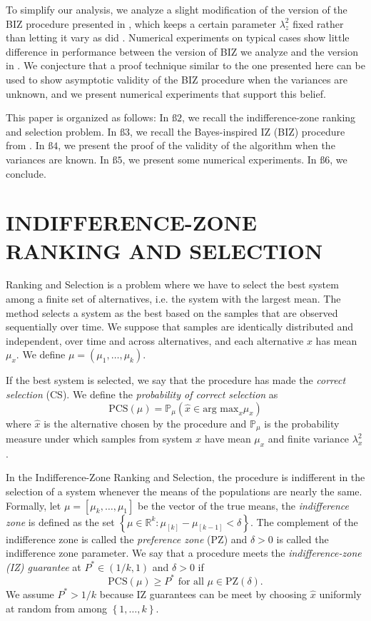\documentclass{wscpaperproc}
\theoremstyle{wsc}
\begin{document}
To simplify our analysis, we analyze a slight modification of the version of the BIZ procedure presented in \cite{Frazier:BIZ}, which keeps a certain parameter $\lambda^2_z$ fixed rather than letting it vary as did \cite{Frazier:BIZ}.  Numerical experiments on typical cases show little difference in performance between the version of BIZ we analyze and the version in .
We conjecture that a proof technique similar to the one presented here can be used to show asymptotic validity of the BIZ procedure when
the variances are unknown, and we present numerical experiments that support this belief. 


This paper is organized as follows: In $\text{ß}2$, we recall the
indifference-zone ranking and selection problem. In $\text{ß}3$,
we recall the Bayes-inspired IZ (BIZ) procedure from . In $\text{ß}4$,
we present the proof of the validity of the algorithm when the variances
are known. In $\text{ß}5$, we present some numerical experiments. 
In $\text{ß}6$, we conclude.



\section{INDIFFERENCE-ZONE RANKING AND SELECTION}

Ranking and Selection is a problem where we have to select the best system
among a finite set of alternatives, i.e. the system with the largest
mean. The method selects a system as the best based on the samples
that are observed sequentially over time. We suppose that samples
are identically distributed and independent, over time and across alternatives, and
each alternative $x$ has mean $\mu_{x}$. We define $\mu=(\mu_{1},\ldots,\mu_{k})$.

If the best system is selected, we say that the procedure has made the \emph{correct selection}
(CS). We define the \emph{probability of correct selection} as 
\[
\mbox{PCS}\left(\mu\right)=\mathbb{P}_{\mu}\left(\hat{x}\in\mbox{arg max}_{x}\mu_{x}\right)
\]
where $\hat{x}$ is the alternative chosen by the procedure and $\mathbb{P}_{\mu}$
is the probability measure under which samples from system $x$ have
mean $\mu_{x}$ and finite variance $\lambda_{x}^{2}$.

In the Indifference-Zone Ranking and Selection, the procedure is indifferent
in the selection of a system whenever the means of the populations
are nearly the same. Formally, let $\mu=\left[\mu_{k},\ldots,\mu_{1}\right]$
be the vector of the true means, the \emph{indifference zone} is defined
as the set $\left\{ \mu\in\mathbb{R}^{k}:\mu_{\left[k\right]}-\mu_{\left[k-1\right]}<\delta\right\} $.
The complement of the indifference zone is called the \emph{preference
zone} (PZ) and $\delta>0$ is called the indifference zone parameter.
We say that a procedure meets the \emph{indifference-zone (IZ) guarantee
}at $P^{*}\in\left(1/k,1\right)$ and $\delta>0$ if
\[
\mbox{PCS}\left(\mu\right)\geq P^{*}\mbox{ for all }\mu\in\mbox{PZ}\left(\delta\right).
\]
We assume $P^{*}>1/k$ because IZ guarantees can be meet by choosing
$\hat{x}$ uniformly at random from among $\left\{ 1,\ldots,k\right\} $.
\end{document}
